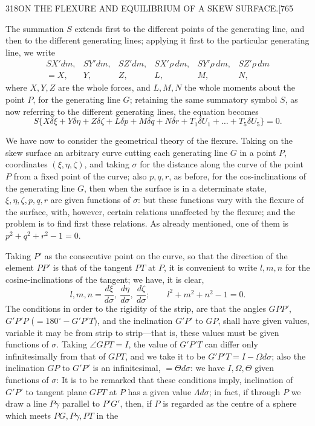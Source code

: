 \documentclass[11pt]{article}
\begin{document}
\begin{center}
{\small 318\hfill ON THE FLEXURE AND EQUILIBRIUM OF A SKEW SURFACE.\hfill [765}
\end{center}

The summation $S$ extends first to the different points of the generating line, and
then to the different generating lines; applying it first to the particular generating
line, we write
\[
\begin{array}{ccccccc}
SX'dm, & SY'dm, & SZ'dm, & SX'\rho\,dm, & SY'\rho\,dm, & SZ'\rho\,dm \\
= X, & Y, & Z, & L, & M, & N,
\end{array}
\]
where $X, Y, Z$ are the whole forces, and $L, M, N$ the whole moments about the
point $P$, for the generating line $G$; retaining the same summatory symbol $S$, as now
referring to the different generating lines, the equation becomes
\[
S\{X\delta\xi + Y\delta\eta + Z\delta\zeta + L\delta p + M\delta q + N\delta r + T_1\delta U_1 + \ldots + T_5\delta U_5\} = 0.
\]

We have now to consider the geometrical theory of the flexure. Taking on the
skew surface an arbitrary curve cutting each generating line $G$ in a point $P$, coordinates
$(\xi, \eta, \zeta)$, and taking $\sigma$ for the distance along the curve of the point $P$ from a fixed
point of the curve; also $p, q, r$, as before, for the cos-inclinations of the generating
line $G$, then when the surface is in a determinate state, $\xi, \eta, \zeta, p, q, r$ are given
functions of $\sigma$: but these functions vary with the flexure of the surface, with, however,
certain relations unaffected by the flexure; and the problem is to find first these
relations. As already mentioned, one of them is $p^2 + q^2 + r^2 - 1 = 0$.

Taking $P'$ as the consecutive point on the curve, so that the direction of the
element $PP'$ is that of the tangent $PT$ at $P$, it is convenient to write $l, m, n$ for
the cosine-inclinations of the tangent; we have, it is clear,
\[
l, m, n = \frac{d\xi}{d\sigma},\ \frac{d\eta}{d\sigma},\ \frac{d\zeta}{d\sigma};\qquad l^2 + m^2 + n^2 - 1 = 0.
\]
The conditions in order to the rigidity of the strip, are that the angles $GPP'$,
$G'P'P$ ($= 180^\circ - G'P'T$), and the inclination $G'P'$ to $GP$, shall have given values,
variable it may be from strip to strip---that is, these values must be given functions
of $\sigma$. Taking $\angle GPT = I$, the value of $G'P'T$ can differ only infinitesimally from that
of $GPT$, and we take it to be $G'P'T = I - \Omega d\sigma$; also the inclination $GP$ to $G'P'$
is an infinitesimal, $= \Theta d\sigma$: we have $I, \Omega, \Theta$ given functions of $\sigma$: It is to be
remarked that these conditions imply, inclination of $G'P'$ to tangent plane $GPT$ at $P$
has a given value $\Lambda d\sigma$; in fact, if through $P$ we draw a line $P\gamma$ parallel to $P'G'$,
then, if $P$ is regarded as the centre of a sphere which meets $PG, P\gamma, PT$ in the
\end{document}
